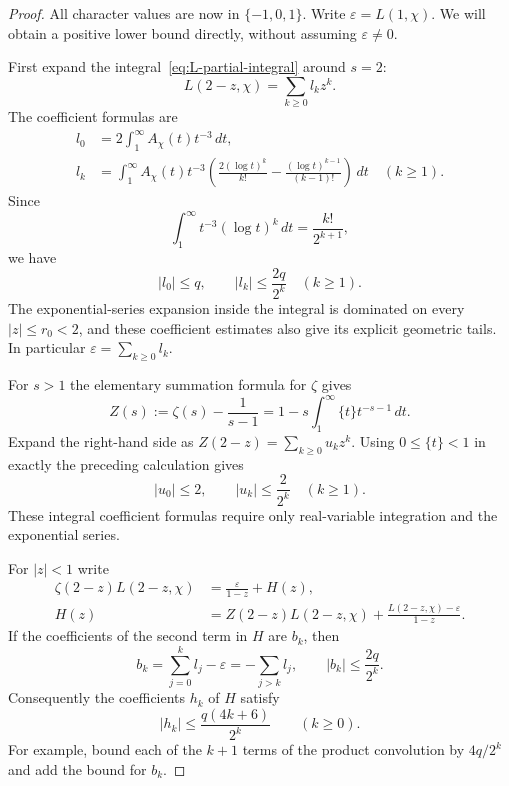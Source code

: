 \begin{proof}
All character values are now in $\{-1,0,1\}$.  Write $\varepsilon=L(1,\chi)$.
We will obtain a positive lower bound directly, without assuming
$\varepsilon\neq0$.

First expand the integral~\eqref{eq:L-partial-integral} around $s=2$:
\[
 L(2-z,\chi)=\sum_{k\geq0}l_kz^k.
\]
The coefficient formulas are
\begin{align*}
 l_0&=2\int_1^\infty A_\chi(t)t^{-3}\,dt,\\
 l_k&=\int_1^\infty A_\chi(t)t^{-3}
 \left(\frac{2(\log t)^k}{k!}
       -\frac{(\log t)^{k-1}}{(k-1)!}\right)\,dt\quad(k\geq1).
\end{align*}
Since
\[
 \int_1^\infty t^{-3}(\log t)^k\,dt=\frac{k!}{2^{k+1}},
\]
we have
\begin{equation}
 |l_0|\leq q,\qquad |l_k|\leq\frac{2q}{2^k}\quad(k\geq1).
 \label{eq:l-coefficients}
\end{equation}
The exponential-series expansion inside the integral is dominated on every
$|z|\leq r_0<2$, and these coefficient estimates also give its explicit
geometric tails.  In particular $\varepsilon=\sum_{k\geq0}l_k$.

For $s>1$ the elementary summation formula for $\zeta$ gives
\[
 Z(s):=\zeta(s)-\frac1{s-1}
       =1-s\int_1^\infty\{t\}t^{-s-1}\,dt.
\]
Expand the right-hand side as
$Z(2-z)=\sum_{k\geq0}u_kz^k$.  Using $0\leq\{t\}<1$ in exactly the preceding
calculation gives
\begin{equation}
 |u_0|\leq2,\qquad |u_k|\leq\frac2{2^k}\quad(k\geq1).
 \label{eq:u-coefficients}
\end{equation}
These integral coefficient formulas require only real-variable integration
and the exponential series.

For $|z|<1$ write
\begin{align}
 \zeta(2-z)L(2-z,\chi)
   &=\frac{\varepsilon}{1-z}+H(z),\label{eq:positive-series-decomp}\\
 H(z)&=Z(2-z)L(2-z,\chi)
       +\frac{L(2-z,\chi)-\varepsilon}{1-z}.
 \nonumber
\end{align}
If the coefficients of the second term in $H$ are $b_k$, then
\[
 b_k=\sum_{j=0}^k l_j-\varepsilon=-\sum_{j>k}l_j,
 \qquad |b_k|\leq\frac{2q}{2^k}.
\]
Consequently the coefficients $h_k$ of $H$ satisfy
\begin{equation}
 |h_k|\leq\frac{q(4k+6)}{2^k}\qquad(k\geq0).
 \label{eq:h-coefficients}
\end{equation}
For example, bound each of the $k+1$ terms of the product convolution by
$4q/2^k$ and add the bound for $b_k$.


\end{proof}
